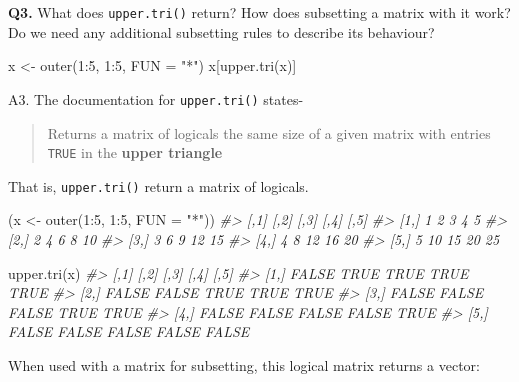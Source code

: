 \documentclass[
]{book}
\newenvironment{Shaded}{\begin{snugshade}}{\end{snugshade}}
\newcommand{\AttributeTok}[1]{\textcolor[rgb]{0.77,0.63,0.00}{#1}}
\newcommand{\CommentTok}[1]{\textcolor[rgb]{0.56,0.35,0.01}{\textit{#1}}}
\newcommand{\DecValTok}[1]{\textcolor[rgb]{0.00,0.00,0.81}{#1}}
\newcommand{\FunctionTok}[1]{\textcolor[rgb]{0.00,0.00,0.00}{#1}}
\newcommand{\NormalTok}[1]{#1}
\newcommand{\OtherTok}[1]{\textcolor[rgb]{0.56,0.35,0.01}{#1}}
\newcommand{\SpecialCharTok}[1]{\textcolor[rgb]{0.00,0.00,0.00}{#1}}
\newcommand{\StringTok}[1]{\textcolor[rgb]{0.31,0.60,0.02}{#1}}
\begin{document}
\textbf{Q3.} What does \texttt{upper.tri()} return? How does subsetting a matrix with it work? Do we need any additional subsetting rules to describe its behaviour?

\begin{Shaded}
\begin{Highlighting}[]
\NormalTok{x }\OtherTok{\textless{}{-}} \FunctionTok{outer}\NormalTok{(}\DecValTok{1}\SpecialCharTok{:}\DecValTok{5}\NormalTok{, }\DecValTok{1}\SpecialCharTok{:}\DecValTok{5}\NormalTok{, }\AttributeTok{FUN =} \StringTok{"*"}\NormalTok{)}
\NormalTok{x[}\FunctionTok{upper.tri}\NormalTok{(x)]}
\end{Highlighting}
\end{Shaded}

A3. The documentation for \texttt{upper.tri()} states-

\begin{quote}
Returns a matrix of logicals the same size of a given matrix with entries \texttt{TRUE} in the \textbf{upper triangle}
\end{quote}

That is, \texttt{upper.tri()} return a matrix of logicals.

\begin{Shaded}
\begin{Highlighting}[]
\NormalTok{(x }\OtherTok{\textless{}{-}} \FunctionTok{outer}\NormalTok{(}\DecValTok{1}\SpecialCharTok{:}\DecValTok{5}\NormalTok{, }\DecValTok{1}\SpecialCharTok{:}\DecValTok{5}\NormalTok{, }\AttributeTok{FUN =} \StringTok{"*"}\NormalTok{))}
\CommentTok{\#\textgreater{}      [,1] [,2] [,3] [,4] [,5]}
\CommentTok{\#\textgreater{} [1,]    1    2    3    4    5}
\CommentTok{\#\textgreater{} [2,]    2    4    6    8   10}
\CommentTok{\#\textgreater{} [3,]    3    6    9   12   15}
\CommentTok{\#\textgreater{} [4,]    4    8   12   16   20}
\CommentTok{\#\textgreater{} [5,]    5   10   15   20   25}

\FunctionTok{upper.tri}\NormalTok{(x)}
\CommentTok{\#\textgreater{}       [,1]  [,2]  [,3]  [,4]  [,5]}
\CommentTok{\#\textgreater{} [1,] FALSE  TRUE  TRUE  TRUE  TRUE}
\CommentTok{\#\textgreater{} [2,] FALSE FALSE  TRUE  TRUE  TRUE}
\CommentTok{\#\textgreater{} [3,] FALSE FALSE FALSE  TRUE  TRUE}
\CommentTok{\#\textgreater{} [4,] FALSE FALSE FALSE FALSE  TRUE}
\CommentTok{\#\textgreater{} [5,] FALSE FALSE FALSE FALSE FALSE}
\end{Highlighting}
\end{Shaded}

When used with a matrix for subsetting, this logical matrix returns a vector:
\end{document}

